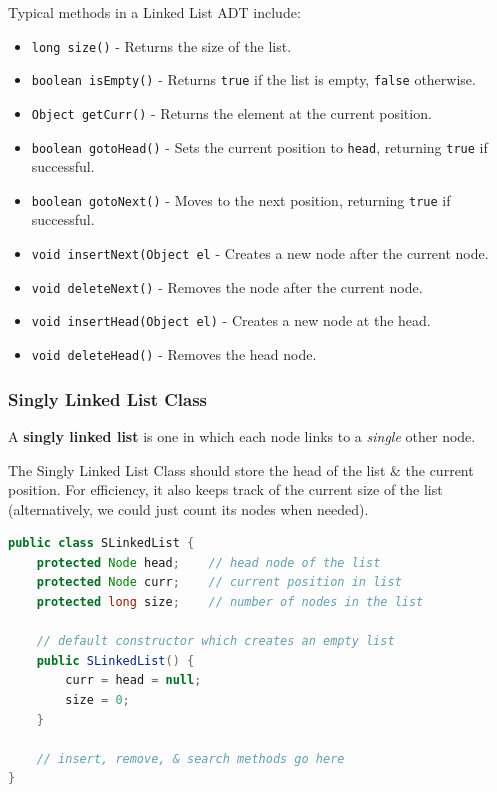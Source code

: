 \documentclass[11pt]{article}
\begin{document}
Typical methods in a Linked List ADT include:
\begin{itemize}
    \item   \verb|long size()| - Returns the size of the list. 
    \item   \verb|boolean isEmpty()| - Returns \verb|true| if the list is empty, \verb|false| otherwise. 
    \item   \verb|Object getCurr()| - Returns the element at the current position. 
    \item   \verb|boolean gotoHead()| - Sets the current position to \verb|head|, returning \verb|true| if successful. 
    \item   \verb|boolean gotoNext()| - Moves to the next position, returning \verb|true| if successful.
    \item   \verb|void insertNext(Object el| - Creates a new node after the current node. 
    \item   \verb|void deleteNext()| - Removes the node after the current node. 
    \item   \verb|void insertHead(Object el)| - Creates a new node at the head. 
    \item   \verb|void deleteHead()| - Removes the head node. 
\end{itemize}

\subsubsection{Singly Linked List Class}
A \textbf{singly linked list} is one in which each node links to a \textit{single} other node. 

The Singly Linked List Class should store the head of the list \& the current position. 
For efficiency, it also keeps track of the current size of the list (alternatively, we could just count its nodes when needed). 

\begin{lstlisting}[language=Java]
public class SLinkedList {
    protected Node head;    // head node of the list
    protected Node curr;    // current position in list 
    protected long size;    // number of nodes in the list 

    // default constructor which creates an empty list
    public SLinkedList() {
        curr = head = null; 
        size = 0; 
    } 

    // insert, remove, & search methods go here 
}
\end{lstlisting}
\end{document}
